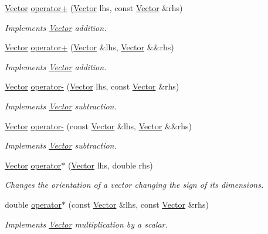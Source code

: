 \begin{DoxyCompactItemize}
\item 
\hyperlink{classzbe_1_1_vector}{Vector} \hyperlink{classzbe_1_1_vector_aa00684a017bf5c29d04889cd160208dc}{operator+} (\hyperlink{classzbe_1_1_vector}{Vector} lhs, const \hyperlink{classzbe_1_1_vector}{Vector} \&rhs)
\begin{DoxyCompactList}\small\item\em Implements \hyperlink{classzbe_1_1_vector}{Vector} addition. \end{DoxyCompactList}\item 
\hyperlink{classzbe_1_1_vector}{Vector} \hyperlink{classzbe_1_1_vector_a4cc289b80e2fcb276841865d247a68e2}{operator+} (\hyperlink{classzbe_1_1_vector}{Vector} \&lhs, \hyperlink{classzbe_1_1_vector}{Vector} \&\&rhs)
\begin{DoxyCompactList}\small\item\em Implements \hyperlink{classzbe_1_1_vector}{Vector} addition. \end{DoxyCompactList}\item 
\hyperlink{classzbe_1_1_vector}{Vector} \hyperlink{classzbe_1_1_vector_a23f5fd27917e1626fc0a07fd5b635f66}{operator-\/} (\hyperlink{classzbe_1_1_vector}{Vector} lhs, const \hyperlink{classzbe_1_1_vector}{Vector} \&rhs)
\begin{DoxyCompactList}\small\item\em Implements \hyperlink{classzbe_1_1_vector}{Vector} subtraction. \end{DoxyCompactList}\item 
\hyperlink{classzbe_1_1_vector}{Vector} \hyperlink{classzbe_1_1_vector_a7a4ea7ee2d59cb2320f59d5ee8ed8b3c}{operator-\/} (const \hyperlink{classzbe_1_1_vector}{Vector} \&lhs, \hyperlink{classzbe_1_1_vector}{Vector} \&\&rhs)
\begin{DoxyCompactList}\small\item\em Implements \hyperlink{classzbe_1_1_vector}{Vector} subtraction. \end{DoxyCompactList}\item 
\hyperlink{classzbe_1_1_vector}{Vector} \hyperlink{classzbe_1_1_vector_ad2d25cf5fc77db8c11d242bd491b64f9}{operator$\ast$} (\hyperlink{classzbe_1_1_vector}{Vector} lhs, double rhs)
\begin{DoxyCompactList}\small\item\em Changes the orientation of a vector changing the sign of its dimensions. \end{DoxyCompactList}\item 
double \hyperlink{classzbe_1_1_vector_a0e8b1be97267a83a75eda5e387aeb635}{operator$\ast$} (const \hyperlink{classzbe_1_1_vector}{Vector} \&lhs, const \hyperlink{classzbe_1_1_vector}{Vector} \&rhs)
\begin{DoxyCompactList}\small\item\em Implements \hyperlink{classzbe_1_1_vector}{Vector} multiplication by a scalar. \end{DoxyCompactList}\end{DoxyCompactItemize}


